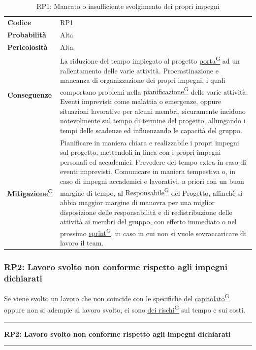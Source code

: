 \documentclass[a4paper,12pt]{article}
\providecommand{\glslink}[2]{\href{https://alittlebyte-19.github.io/Documentazione/glossario.html\#gls-#1}{\underline{#2}\textsuperscript{\scriptsize G}}}
\begin{document}
\begin{table}[h]
\begin{tabular}{>{\bfseries}p{3cm} | p{12.2cm}}
Codice & RP1 \\

Probabilità & Alta\\

Pericolosità & Alta\\

Conseguenze & La riduzione del tempo impiegato al progetto \glslink{porta}{porta} ad un rallentamento delle varie attività. Procrastinazione e mancanza di organizzazione dei propri impegni,
i quali comportano problemi nella \glslink{pianificazione}{pianificazione} delle varie attività. Eventi imprevisti come malattia o emergenze, oppure situazioni lavorative per alcuni membri, sicuramente 
incidono notevolmente sul tempo di termine del progetto, allungando i tempi delle scadenze ed influenzando le capacità del gruppo.\\

\glslink{mitigazione-dei-rischi}{Mitigazione} & Pianificare in maniera chiara e realizzabile i propri impegni sul progetto, mettendoli in linea con i propri impegni personali ed accademici.
Prevedere del tempo extra in caso di eventi imprevisti. Comunicare in maniera tempestiva o, in caso di impegni accademici e lavorativi, a priori con un buon margine di tempo, al \glslink{responsabile}{Responsabile} del Progetto, affinchè si abbia maggior margine
di manovra per una miglior disposizione delle responsabilità e di redistribuzione delle attività ai membri del gruppo, con effetto immediato o nel prossimo \glslink{sprint}{sprint}, in caso in cui 
non si vuole sovraccaricare di lavoro il team. \\
\end{tabular}
\caption{RP1: Mancato o insufficiente svolgimento dei propri impegni}
\end{table}

\newpage

\subsubsection{RP2: Lavoro svolto non conforme rispetto agli impegni dichiarati}
Se viene svolto un lavoro che non coincide con le specifiche del \glslink{capitolato}{capitolato} oppure non si adempie al lavoro svolto, ci sono \glslink{mitigazione-dei-rischi}{dei rischi} sul tempo e sui costi.
\vspace{0.5cm}
\hrule
\vspace{0.5em}
\textbf{RP2: Lavoro svolto non conforme rispetto agli impegni dichiarati}
\vspace{0.5em}
\hrule
\vspace{1cm}
\end{document}
